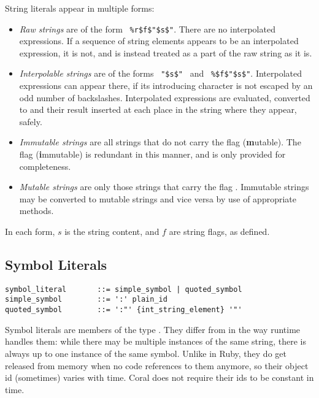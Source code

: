 String literals appear in multiple forms:
\begin{itemize}
  \item {\em Raw strings} are of the form ~\lstinline!%r$f$"$s$"!. There are no interpolated expressions. If a sequence of string elements appears to be an interpolated expression, it is not, and is instead treated as a part of the raw string as it is. 
  \item {\em Interpolable strings} are of the forms ~\lstinline!"$s$"!~ and ~\lstinline!%$f$"$s$"!. Interpolated expressions can appear there, if its introducing character is not escaped by an odd number of backslashes. Interpolated expressions are evaluated, converted to  and their result inserted at each place in the string where they appear, safely. 
  \item {\em Immutable strings} are all strings that do not carry the flag  (\textbf{m}utable). The flag  (\textbf{i}mmutable) is redundant in this manner, and is only provided for completeness. 
  \item {\em Mutable strings} are only those strings that carry the flag . Immutable strings may be converted to mutable strings and vice versa by use of appropriate methods. 
\end{itemize}

In each form, $s$ is the string content, and $f$ are string flags, as defined. 





\subsection{Symbol Literals}
\label{sec:symbolliterals}

\syntax\begin{lstlisting}
symbol_literal       ::= simple_symbol | quoted_symbol
simple_symbol        ::= ':' plain_id
quoted_symbol        ::= ':"' {int_string_element} '"'
\end{lstlisting}

Symbol literals are members of the type \lstinline@Symbol@. They differ from  in the way runtime handles them: while there may be multiple instances of the same string, there is always up to one instance of the same symbol. Unlike in Ruby, they do get released from memory when no code references to them anymore, so their object id (sometimes) varies with time. Coral does not require their ids to be constant in time. 









